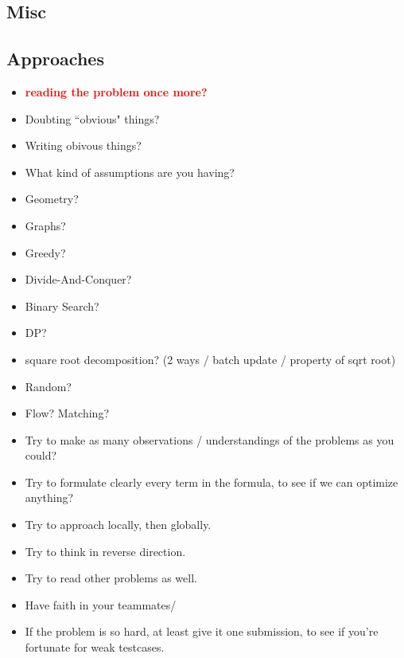 \documentclass[portrait, 8pt, a4paper, oneside]{extarticle}
\begin{document}
\begin{multicols}{3}
\maketitlepage

















\section{Misc}


\subsection{Approaches}
\begin{itemize}
    \item \textcolor{red}{\textbf{reading the problem once more?}}

    \item Doubting ``obvious" things?
    \item Writing obivous things?
    \item What kind of assumptions are you having?

    
    \item Geometry?
    \item Graphs?
    \item Greedy?
    \item Divide-And-Conquer?
    \item Binary Search?
    \item DP?
    \item square root decomposition? (2 ways / batch update / property of sqrt root)
    \item Random?
    \item Flow? Matching?

    
    \item Try to make as many observations / understandings of the problems as you could?
    \item Try to formulate clearly every term in the formula, to see if we can optimize anything?
    \item Try to approach locally, then globally.
    \item Try to think in reverse direction.
    \item Try to read other problems as well.
    \item Have faith in your teammates/
    \item If the problem is so hard, at least give it one submission, to see if you're fortunate for weak testcases.
    

\end{itemize}
\end{multicols}
\end{document}
